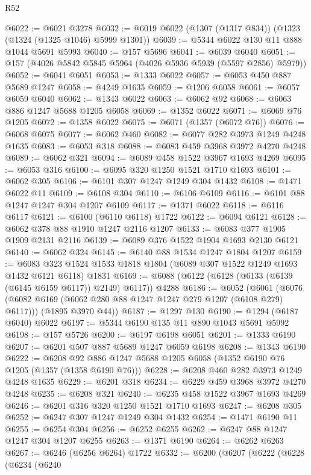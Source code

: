 \begin{lexlean}{R52}
\begin{coremodule}
@6022 := @6021 @3278
@6032 := @6019 @6022 (@1307 (@1317 @834)) (@1323 (@1324 (@1325 @1046) @5999 @1301))
@6039 := @5344 @6022 @130 @11 @888 @1044 @5691 @5993
@6040 := @157 @5696
@6041 := @6039 @6040
@6051 := @157 (@4026 @5842 @5845 @5964 (@4026 @5936 @5939 (@5597 @2856) @5979))
@6052 := @6041 @6051
@6053 := @1333 @6022
@6057 := @6053 @450 @887 @5689 @1247
@6058 := @4249 @1635
@6059 := @1206 @6058
@6061 := @6057 @6059 @6040
@6062 := @1343 @6022
@6063 := @6062 @92
@6068 := @6063 @886 @1247 @5688 @1205 @6058
@6069 := @1352 @6022
@6071 := @6069 @76 @1205
@6072 := @1358 @6022
@6075 := @6071 (@1357 (@6072 @76))
@6076 := @6068 @6075
@6077 := @6062 @460
@6082 := @6077 @282 @3973 @1249 @4248 @1635
@6083 := @6053 @318
@6088 := @6083 @459 @3968 @3972 @4270 @4248
@6089 := @6062 @321
@6094 := @6089 @458 @1522 @3967 @1693 @4269
@6095 := @6053 @316
@6100 := @6095 @320 @1250 @1521 @1710 @1693
@6101 := @6062 @305
@6106 := @6101 @307 @1247 @1249 @304 @1432
@6108 := @1471 @6022 @11
@6109 := @6108 @304
@6110 := @6106 @6109
@6116 := @6101 @88 @1247 @1247 @304 @1207 @6109
@6117 := @1371 @6022
@6118 := @6116 @6117
@6121 := @6100 (@6110 @6118) @1722
@6122 := @6094 @6121
@6128 := @6062 @378 @88 @1910 @1247 @2116 @1207
@6133 := @6083 @377 @1905 @1909 @2131 @2116
@6139 := @6089 @376 @1522 @1904 @1693 @2130 @6121
@6140 := @6062 @324
@6145 := @6140 @88 @1534 @1247 @1804 @1207
@6159 := @6083 @323 @1524 @1533 @1818 @1804 (@6089 @307 @1522 @1249 @1693 @1432 @6121 @6118) @1831
@6169 := @6088 (@6122 (@6128 (@6133 (@6139 (@6145 @6159 @6117)) @2149) @6117)) @4288
@6186 := @6052
    (@6061
      (@6076 (@6082 @6169 (@6062 @280 @88 @1247 @1247 @279 @1207 (@6108 @279) @6117)))
      (@1895 @3970 @44))
@6187 := @1297 @130
@6190 := @1294 (@6187 @6040) @6022
@6197 := @5344 @6190 @135 @11 @890 @1043 @5691 @5992
@6198 := @157 @5726
@6200 := @6197 @6198 @6051
@6201 := @1333 @6190
@6207 := @6201 @507 @887 @5689 @1247 @6059 @6198
@6208 := @1343 @6190
@6222 := @6208 @92 @886 @1247 @5688 @1205 @6058 (@1352 @6190 @76 @1205 (@1357 (@1358 @6190 @76)))
@6228 := @6208 @460 @282 @3973 @1249 @4248 @1635
@6229 := @6201 @318
@6234 := @6229 @459 @3968 @3972 @4270 @4248
@6235 := @6208 @321
@6240 := @6235 @458 @1522 @3967 @1693 @4269
@6246 := @6201 @316 @320 @1250 @1521 @1710 @1693
@6247 := @6208 @305
@6252 := @6247 @307 @1247 @1249 @304 @1432
@6254 := @1471 @6190 @11
@6255 := @6254 @304
@6256 := @6252 @6255
@6262 := @6247 @88 @1247 @1247 @304 @1207 @6255
@6263 := @1371 @6190
@6264 := @6262 @6263
@6267 := @6246 (@6256 @6264) @1722
@6332 := @6200
    (@6207
      (@6222
        (@6228
          (@6234
            (@6240

\end{coremodule}
\end{lexlean}
